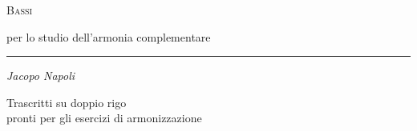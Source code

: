 \documentclass[12pt]{article}
\begin{document}
\centering
\vspace*{\fill}

{\fontsize{38}{46}\selectfont\scshape Bassi\par}
\vspace{1.2em}
{\fontsize{22}{28}\selectfont per lo studio dell’armonia complementare\par}

\vspace{2.5em}
\rule{0.35\textwidth}{0.4pt}
\vspace{2.5em}

{\fontsize{20}{24}\selectfont\itshape Jacopo Napoli\par}

\vspace{1.8em}
{\fontsize{14}{18}\selectfont Trascritti su doppio rigo\\ pronti per gli esercizi di armonizzazione\par}

\vspace*{\fill}
\end{document}
